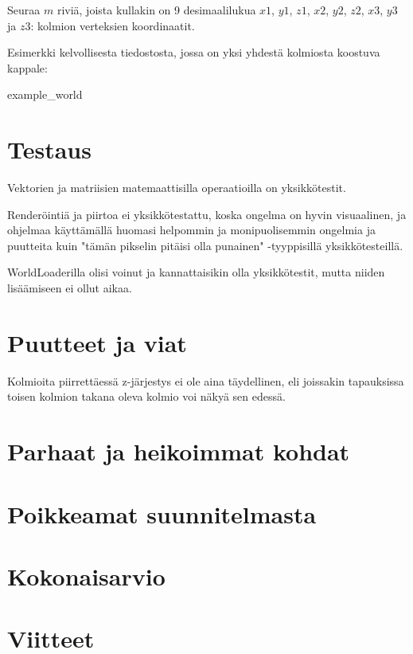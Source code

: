 \documentclass[12pt] {article}
\begin{document}
Seuraa $m$ riviä, joista kullakin on 9 desimaalilukua $x1$, $y1$, $z1$, $x2$, $y2$, $z2$, $x3$, $y3$ ja $z3$: kolmion verteksien koordinaatit.

Esimerkki kelvollisesta tiedostosta, jossa on yksi yhdestä kolmiosta koostuva kappale:

 {example_world}

\section {Testaus}

Vektorien ja matriisien matemaattisilla operaatioilla on yksikkötestit.

Renderöintiä ja piirtoa ei yksikkötestattu, koska ongelma on hyvin visuaalinen, ja ohjelmaa käyttämällä huomasi helpommin ja monipuolisemmin ongelmia ja puutteita kuin "tämän pikselin pitäisi olla punainen" -tyyppisillä yksikkötesteillä.

WorldLoaderilla olisi voinut ja kannattaisikin olla yksikkötestit, mutta niiden lisäämiseen ei ollut aikaa.

\section {Puutteet ja viat}

Kolmioita piirrettäessä z-järjestys ei ole aina täydellinen, eli joissakin tapauksissa toisen kolmion takana oleva kolmio voi näkyä sen edessä.

\section {Parhaat ja heikoimmat kohdat}

\section {Poikkeamat suunnitelmasta}

\section {Kokonaisarvio}

\section {Viitteet}
\end{document}

